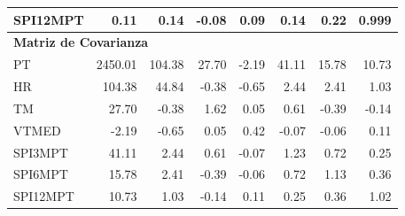 \begin{table}[H]
\begin{tabular}{lrrrrrrr}
SPI12MPT & 0.11 & 0.14 & -0.08 & 0.09 & 0.14 & 0.22 & 0.999 \\
\midrule
\multicolumn{8}{l}{\textbf{Matriz de Covarianza}} \\
\midrule
PT       & 2450.01 & 104.38 & 27.70 & -2.19 & 41.11 & 15.78 & 10.73 \\
HR       & 104.38 & 44.84 & -0.38 & -0.65 & 2.44 & 2.41 & 1.03 \\
TM       & 27.70 & -0.38 & 1.62 & 0.05 & 0.61 & -0.39 & -0.14 \\
VTMED    & -2.19 & -0.65 & 0.05 & 0.42 & -0.07 & -0.06 & 0.11 \\
SPI3MPT  & 41.11 & 2.44 & 0.61 & -0.07 & 1.23 & 0.72 & 0.25 \\
SPI6MPT  & 15.78 & 2.41 & -0.39 & -0.06 & 0.72 & 1.13 & 0.36 \\
SPI12MPT & 10.73 & 1.03 & -0.14 & 0.11 & 0.25 & 0.36 & 1.02 \\
\bottomrule
\end{tabular}
\end{table}


